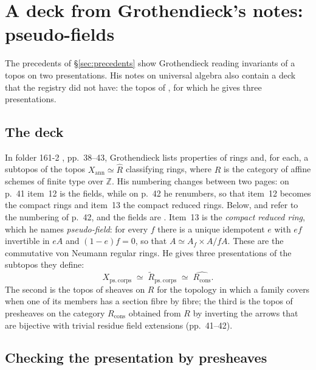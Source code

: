 \section{A deck from Grothendieck's notes: pseudo-fields}\label{sec:pseudofields}

The precedents of \S\ref{sec:precedents} show Grothendieck reading invariants of a topos on two presentations. His notes on universal algebra also contain a deck that the registry did not have: the topos of , for which he gives three presentations.

\subsection{The deck}

In folder 161-2 \cite{grothendieck-161-2}, pp.~38--43, Grothendieck lists properties of rings and, for each, a subtopos of the topos $X_{\mathrm{ann}}\simeq\widehat R$ classifying rings, where $R$ is the category of affine schemes of finite type over $\mathbb Z$. His numbering changes between two pages: on p.~41 item~12 is the fields, while on p.~42 he renumbers, so that item~12 becomes the compact rings and item~13 the compact reduced rings. Below,  and  refer to the numbering of p.~42, and the fields are . Item~13 is the \emph{compact reduced ring}, which he names \emph{pseudo-field}: for every $f$ there is a unique idempotent $e$ with $ef$ invertible in $eA$ and $(1-e)f=0$, so that $A\simeq A_f\times A/fA$. These are the commutative von Neumann regular rings. He gives three presentations of the subtopos they define:
\[
X_{\mathrm{ps.\,corps}}\;\simeq\;\widetilde R_{\mathrm{ps.\,corps}}\;\simeq\;\widehat{R_{\mathrm{cons}}}.
\]
The second is the topos of sheaves on $R$ for the topology in which a family covers when one of its members has a section fibre by fibre; the third is the topos of presheaves on the category $R_{\mathrm{cons}}$ obtained from $R$ by inverting the arrows that are bijective with trivial residue field extensions (pp.~41--42).

\subsection{Checking the presentation by presheaves}

